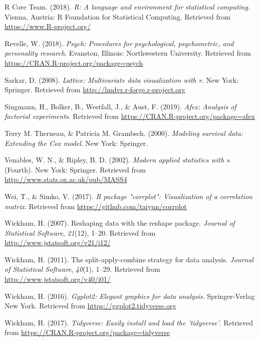 \documentclass[man]{apa6}
\begin{document}
\leavevmode\hypertarget{ref-R-base}{}%
R Core Team. (2018). \emph{R: A language and environment for statistical computing}. Vienna, Austria: R Foundation for Statistical Computing. Retrieved from \url{https://www.R-project.org/}

\leavevmode\hypertarget{ref-R-psych}{}%
Revelle, W. (2018). \emph{Psych: Procedures for psychological, psychometric, and personality research}. Evanston, Illinois: Northwestern University. Retrieved from \url{https://CRAN.R-project.org/package=psych}

\leavevmode\hypertarget{ref-R-lattice}{}%
Sarkar, D. (2008). \emph{Lattice: Multivariate data visualization with r}. New York: Springer. Retrieved from \url{http://lmdvr.r-forge.r-project.org}

\leavevmode\hypertarget{ref-R-afex}{}%
Singmann, H., Bolker, B., Westfall, J., \& Aust, F. (2019). \emph{Afex: Analysis of factorial experiments}. Retrieved from \url{https://CRAN.R-project.org/package=afex}

\leavevmode\hypertarget{ref-R-survival-book}{}%
Terry M. Therneau, \& Patricia M. Grambsch. (2000). \emph{Modeling survival data: Extending the Cox model}. New York: Springer.

\leavevmode\hypertarget{ref-R-MASS}{}%
Venables, W. N., \& Ripley, B. D. (2002). \emph{Modern applied statistics with s} (Fourth). New York: Springer. Retrieved from \url{http://www.stats.ox.ac.uk/pub/MASS4}

\leavevmode\hypertarget{ref-R-corrplot2017}{}%
Wei, T., \& Simko, V. (2017). \emph{R package "corrplot": Visualization of a correlation matrix}. Retrieved from \url{https://github.com/taiyun/corrplot}

\leavevmode\hypertarget{ref-R-reshape2}{}%
Wickham, H. (2007). Reshaping data with the reshape package. \emph{Journal of Statistical Software}, \emph{21}(12), 1--20. Retrieved from \url{http://www.jstatsoft.org/v21/i12/}

\leavevmode\hypertarget{ref-R-plyr}{}%
Wickham, H. (2011). The split-apply-combine strategy for data analysis. \emph{Journal of Statistical Software}, \emph{40}(1), 1--29. Retrieved from \url{http://www.jstatsoft.org/v40/i01/}

\leavevmode\hypertarget{ref-R-ggplot2}{}%
Wickham, H. (2016). \emph{Ggplot2: Elegant graphics for data analysis}. Springer-Verlag New York. Retrieved from \url{https://ggplot2.tidyverse.org}

\leavevmode\hypertarget{ref-R-tidyverse}{}%
Wickham, H. (2017). \emph{Tidyverse: Easily install and load the 'tidyverse'}. Retrieved from \url{https://CRAN.R-project.org/package=tidyverse}
\end{document}

